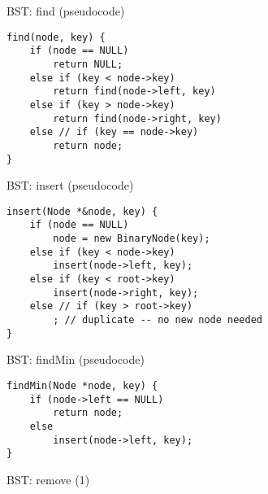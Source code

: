 \usetikzlibrary{graphs,graphdrawing}

\begin{frame}[fragile,label=bstFind]{BST: find}
\lstset{language=C++,style=small}
(pseudocode)
\begin{lstlisting}
find(node, key) {
    if (node == NULL)
        return NULL;
    else if (key < node->key)
        return find(node->left, key)
    else if (key > node->key)
        return find(node->right, key)
    else // if (key == node->key)
        return node;
}
\end{lstlisting}
\end{frame}


\begin{frame}[fragile,label=bstInsert]{BST: insert}
\lstset{language=C++,style=small}
(pseudocode)
\begin{lstlisting}
insert(Node *&node, key) {
    if (node == NULL)
        node = new BinaryNode(key);
    else if (key < node->key)
        insert(node->left, key);
    else if (key < root->key)
        insert(node->right, key);
    else // if (key > root->key)
        ; // duplicate -- no new node needed
}
\end{lstlisting}
\end{frame}


\begin{frame}[fragile,label=findMin]{BST: findMin}
\lstset{language=C++,style=small}
(pseudocode)
\begin{lstlisting}
findMin(Node *node, key) {
    if (node->left == NULL)
        return node;
    else
        insert(node->left, key);
}
\end{lstlisting}
\end{frame}

\begin{frame}[fragile,label=bstRemove1]{BST: remove (1)}
\end{frame}

